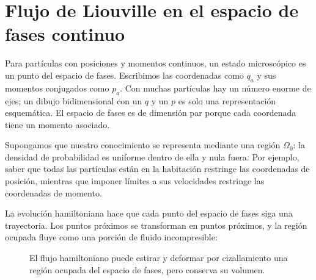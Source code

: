 \begin{classroomqa}
\end{classroomqa}

\section{Flujo de Liouville en el espacio de fases continuo}

Para partículas con posiciones y momentos continuos, un estado microscópico es un punto del espacio de fases. Escribimos las coordenadas como \(q_a\) y sus momentos conjugados como \(p_a\). Con muchas partículas hay un número enorme de ejes; un dibujo bidimensional con un \(q\) y un \(p\) es solo una representación esquemática. El espacio de fases es de dimensión par porque cada coordenada tiene un momento asociado.

Supongamos que nuestro conocimiento se representa mediante una región \(\Omega_0\): la densidad de probabilidad es uniforme dentro de ella y nula fuera. Por ejemplo, saber que todas las partículas están en la habitación restringe las coordenadas de posición, mientras que imponer límites a sus velocidades restringe las coordenadas de momento.

La evolución hamiltoniana hace que cada punto del espacio de fases siga una trayectoria. Los puntos próximos se transforman en puntos próximos, y la región ocupada fluye como una porción de fluido incompresible:
\begin{figure}[htbp]
\centering
{}
\caption{El flujo hamiltoniano puede estirar y deformar por cizallamiento una región ocupada del espacio de fases, pero conserva su volumen.}
\label{fig:sm1-liouville-flow}
\end{figure}

